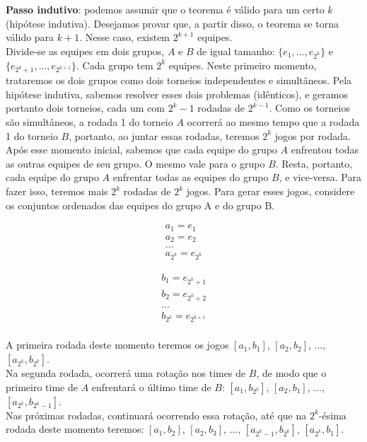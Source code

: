 \documentclass{article}
\begin{document}
\textbf{Passo indutivo}: podemos assumir que o teorema é válido para um certo $k$ (hipótese indutiva). Desejamos provar que, a partir disso, o teorema se torna válido para $k+1$. Nesse caso, existem $2^{k+1}$ equipes.\\

Divide-se as equipes em dois grupos, $A$ e $B$ de igual tamanho: $\{e_1, ..., e_{2^k}\}$ e $\{e_{2^k+1}, ..., e_{2^{k+1}}\}$. Cada grupo tem $2^k$ equipes. Neste primeiro momento, trataremos os dois grupos como dois torneios independentes e simultâneos. Pela hipótese indutiva, sabemos resolver esses dois problemas (idênticos), e geramos portanto dois torneios, cada um com $2^k - 1$ rodadas de $2^{k - 1}$. Como os torneios são simultâneos, a rodada 1 do torneio $A$ ocorrerá ao mesmo tempo que a rodada 1 do torneio $B$, portanto, ao juntar essas rodadas, teremos $2^k$ jogos por rodada.\\

Após esse momento inicial, sabemos que cada equipe do grupo $A$ enfrentou todas as outras equipes de seu grupo. O mesmo vale para o grupo $B$. Resta, portanto, cada equipe do grupo $A$ enfrentar todas as equipes do grupo $B$, e vice-versa. Para fazer isso, teremos mais $2^k$ rodadas de $2^k$ jogos. Para gerar esses jogos, considere os conjuntos ordenados das equipes do grupo A e do grupo B.

\begin{gather}
a_1 = e_1 \\
a_2 = e_2 \\
... \\
a_{2^k} = e_{2^k}\end{gather}

\begin{gather}
b_1 = e_{2^k + 1} \\
b_2 = e_{2^k + 2} \\
... \\
b_{2^k} = e_{2^{k+1}}\\\end{gather}

A primeira rodada deste momento teremos os jogos $[a_1, b_1]$, $[a_2, b_2]$, ..., $[a_{2^k}, b_{2^k}]$.\\

Na segunda rodada, ocorrerá uma rotação nos times de $B$, de modo que o primeiro time de $A$ enfrentará o último time de $B$: $[a_1, b_{2^k}]$, $[a_2, b_1]$, ..., $[a_{2^k}, b_{2^k-1}]$.\\

Nas próximas rodadas, continuará ocorrendo essa rotação, até que na $2^k$-ésima rodada deste momento teremos: $[a_1, b_2]$, $[a_2, b_3]$, ..., $[a_{2^k-1}, b_{2^k}]$, $[a_{2^k}, b_1]$.\\
\end{document}
